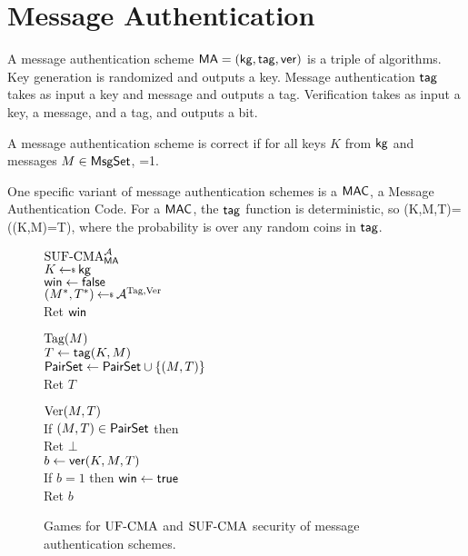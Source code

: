 \section{Message Authentication}
\label{sec:msgauth}

A message authentication scheme $\mathsf{MA} = ({\sf kg},\mathsf{tag},\mathsf{ver})$ is a triple of
algorithms. Key generation is randomized and outputs a key. Message
authentication $\mathsf{tag}$ takes as input a key and message and outputs a tag.
Verification takes as input a key, a message, and a tag, and outputs a bit. 

A message authentication scheme is correct if for all keys $K$ from ${\sf kg}$ and messages $M\in \textsf{MsgSet}$, 
\bnm
{}=1\;.
\enm

One specific variant of message authentication schemes is a $\mbox{\textsf{MAC}}$, a Message Authentication Code. For a $\mathsf{MAC}$, the $\mathsf{tag}$ function is deterministic, so 
\bnm
\ver(K,M,T)=(\mtag(K,M)=T)\;,
\enm
where the probability is over any random coins in $\mathsf{tag}$.
\begin{figure}[t]
	\centering
	{
	\underline{$\textnormal{SUF-CMA}_{\mathsf{MA}}^{\mathcal A}$}\\[1pt]
	$K \getsr \kg$\\
	$\mathsf{win}\gets\mathsf{false}$\\
	$(M^*,T^*) \getsr \advA^{\TagOracle,\VerOracle}$\\
	Ret $\mathsf{win}$\medskip
	}{
	\underline{$\textnormal{Tag}(M)$}\\
	$T \gets \mathsf{tag}(K,M)$\\
	$\textsf{PairSet} \gets \textsf{PairSet} \cup \{(M,T)\}$\\
	Ret $T$\medskip 
	
	\underline{$\textnormal{Ver}(M,T)$}\\
	If $(M,T) \in \textsf{PairSet}$ then \\
	\myInd Ret $\bot$\\
	$b \gets \mathsf{ver}(K,M,T)$\\
	If $b = 1$ then $\mathsf{win}\gets\mathsf{true}$\\
	Ret $b$
	}	
	\caption{Games for $\textnormal{UF-CMA}$ and $\textnormal{SUF-CMA}$ security of message authentication schemes.}
	\label{fig:game-ufcma}
\end{figure}

